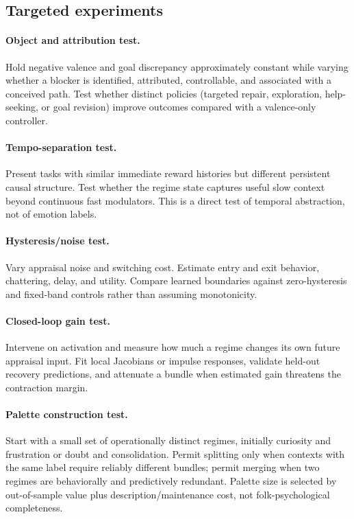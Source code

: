\documentclass[11pt]{article}
\begin{document}
\subsection{Targeted experiments}

\paragraph{Object and attribution test.}
Hold negative valence and goal discrepancy approximately constant while varying
whether a blocker is identified, attributed, controllable, and associated with
a conceived path.  Test whether distinct policies (targeted repair, exploration,
help-seeking, or goal revision) improve outcomes compared with a valence-only
controller.

\paragraph{Tempo-separation test.}
Present tasks with similar immediate reward histories but different persistent
causal structure.  Test whether the regime state captures useful slow context
beyond continuous fast modulators.  This is a direct test of temporal abstraction,
not of emotion labels.

\paragraph{Hysteresis/noise test.}
Vary appraisal noise and switching cost.  Estimate entry and exit behavior,
chattering, delay, and utility.  Compare learned boundaries against zero-hysteresis
and fixed-band controls rather than assuming monotonicity.

\paragraph{Closed-loop gain test.}
Intervene on activation and measure how much a regime changes its own future
appraisal input.  Fit local Jacobians or impulse responses, validate held-out
recovery predictions, and attenuate a bundle when estimated gain threatens the
contraction margin.

\paragraph{Palette construction test.}
Start with a small set of operationally distinct regimes, initially curiosity
and frustration or doubt and consolidation.  Permit splitting only when contexts
with the same label require reliably different bundles; permit merging when two
regimes are behaviorally and predictively redundant.  Palette size is selected
by out-of-sample value plus description/maintenance cost, not folk-psychological
completeness.
\end{document}
